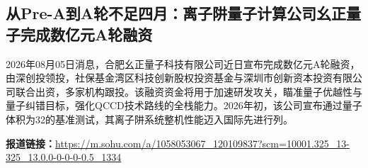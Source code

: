 \documentclass[12pt,a4paper]{ctexart}
\begin{document}
\subsection{ 从Pre-A到A轮不足四月：离子阱量子计算公司幺正量子完成数亿元A轮融资 }

2026年08月05日消息，合肥幺正量子科技有限公司近日宣布完成数亿元A轮融资，由深创投领投，社保基金湾区科技创新股权投资基金与深圳市创新资本投资有限公司联合出资，多家机构跟投。该融资资金将用于加速研发攻关，瞄准量子优越性与量子纠错目标，强化QCCD技术路线的全栈能力。2026年初，该公司宣布通过量子体积为32的基准测试，其离子阱系统整机性能迈入国际先进行列。

\noindent\textbf{报道链接：}\url{https://m.sohu.com/a/1058053067\_120109837?scm=10001.325\_13-325\_13.0.0-0-0-0-0.5\_1334}
\end{document}

